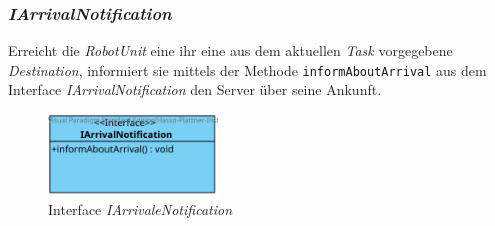 	\subsubsection{\textit{IArrivalNotification}}
	Erreicht die \textit{RobotUnit} eine ihr eine aus dem aktuellen \textit{Task} vorgegebene \textit{Destination}, informiert sie mittels der Methode \texttt{informAboutArrival} aus dem Interface \textit{IArrivalNotification} den Server über seine Ankunft.
	\begin{figure}[H]
	\centering
	\includegraphics[width=0.4\textwidth]{img/2-Entwurf-3-IArrivalNotification}
	\caption{Interface \emph{IArrivaleNotification}}
	\label{IArrivaleNotification}
	\end{figure}

